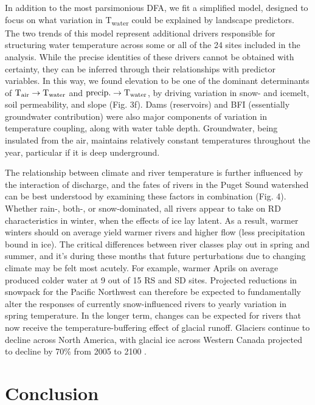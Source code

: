 \documentclass[notitlepage]{article}
\begin{document}
In addition to the most parsimonious DFA, we fit a simplified model, designed to focus on what variation in T\textsubscript{water} could be explained by landscape predictors. The two trends of this model represent additional drivers responsible for structuring water temperature across some or all of the 24 sites included in the analysis. While the precise identities of these drivers cannot be obtained with certainty, they can be inferred through their relationships with predictor variables. In this way, we found elevation to be one of the dominant determinants of $\textrm{T}\textsubscript{air}\rightarrow \textrm{T}\textsubscript{water}$ and $\textrm{precip.}\rightarrow \textrm{T}\textsubscript{water}$, by driving variation in snow- and icemelt, soil permeability, and slope (Fig. 3f). Dams (reservoirs) and BFI (essentially groundwater contribution) were also major components of variation in temperature coupling, along with water table depth. Groundwater, being insulated from the air, maintains relatively constant temperatures throughout the year, particular if it is deep underground.

The relationship between climate and river temperature is further influenced by the interaction of discharge, and the fates of rivers in the Puget Sound watershed can be best understood by examining these factors in combination (Fig. 4). Whether rain-, both-, or snow-dominated, all rivers appear to take on RD characteristics in winter, when the effects of ice lay latent. As a result, warmer winters should on average yield warmer rivers and higher flow (less precipitation bound in ice). The critical differences between river classes play out in spring and summer, and it's during these months that future perturbations due to changing climate may be felt most acutely. For example, warmer Aprils on average produced colder water at 9 out of 15 RS and SD sites. Projected reductions in snowpack for the Pacific Northwest can therefore be expected to fundamentally alter the responses of currently snow-influenced rivers to yearly variation in spring temperature. In the longer term, changes can be expected for rivers that now receive the temperature-buffering effect of glacial runoff. Glaciers continue to decline across North America, with glacial ice across Western Canada projected to decline by 70\% from 2005 to 2100 \citep{clarke2015projected}.

\section*{Conclusion}
\end{document}
